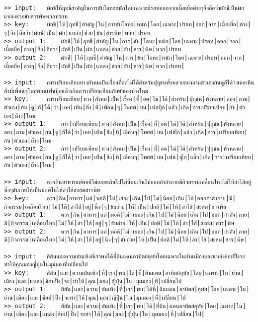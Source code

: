 \documentclass[11pt]{article}
\begin{document}
\begin{Verbatim}[commandchars=\\\{\}]
>> input:	ผักชีให้ฤทธิ์สำคัญในการขับโลหะหนักโดยเฉพาะปรอทออกจากเนื้อเยื่อต่างๆจึงถือว่าผักชีเป็นผักแหล่งช่วยขับสารพิษพวกปรอท
>> key:		ผักชี|ให้|ฤทธิ์|สำคัญ|ใน|การขับโลหะ|หนัก|โดย|เฉพาะ|ปรอท|ออก|จาก|เนื้อเยื่อ|ต่าง|ๆ|จึง|ถือว่า|ผักชี|เป็น|ผัก|แหล่ง|ช่วย|ขับ|สารพิษ|พวก|ปรอท
>> output 1:	ผักชี|ให้|ฤทธิ์|สำคัญ|ใน|การ|ขับ|โลหะ|หนัก|โดย|เฉพาะ|ปรอท|ออก|จาก|เนื้อเยื่อ|ต่างๆ|จึง|ถือว่า|ผักชี|เป็น|ผัก|แหล่ง|ช่วย|ขับ|สาร|พิษ|พวก|ปรอท
>> output 2:	ผักชี||ให้|ฤทธิ์|สำคัญ|ใน|การ|ขับ|โลหะ|หนัก|โดย|เฉพาะ|ปรอท|ออก|จาก|เนื้อเยื่อ|ต่างๆ|จึง|ถือว่า|ผักชี|เป็น|ผัก|แหล่ง|ช่วย|ขับ|สาร|พิษ|พวก|ปรอท|

>> input:	การเปรียบเทียบทางสังคมเป็นเรื่องที่อดไม่ได้สำหรับปุถุชนทั้งหลายลองถามตัวเองกันดูก็ได้ว่าเคยเห็นสิ่งที่เพื่อนๆโพสต์บนเฟซบุ๊กแล้วเกิดการเปรียบเทียบกับตัวเองบ้างไหม
>> key:		การเปรียบเทียบ|ทาง|สังคม|เป็น|เรื่อง|ที่|อด|ไม่|ได้|สำหรับ|ปุถุชน|ทั้งหลาย|ลอง|ถาม|ตัวเอง|กัน|ดู|ก็|ได้|ว่า|เคย|เห็น|สิ่ง|ที่|เพื่อน|ๆ|โพสต์|บน|เฟซบุ๊ก|แล้ว|เกิด|การเปรียบเทียบ|กับ|ตัวเอง|บ้าง|ไหม
>> output 1:	การ|เปรียบเทียบ|ทาง|สังคม|เป็น|เรื่อง|ที่|อด|ไม่|ได้|สำหรับ|ปุถุชน|ทั้งหลาย|ลอง|ถาม|ตัวเอง|กัน|ดู|ก็ได้|ว่า|เคย|เห็น|สิ่ง|ที่|เพื่อนๆ|โพสต์|บน|เฟซ|๊ก|แล้ว|เกิด|การ|เปรียบเทียบ|กับ|ตัวเอง|บ้าง|ไหม
>> output 2:	การ|เปรียบเทียบ|ทาง|สังคม|เป็น|เรื่อง|ที่|อด|ไม่|ได้|สำหรับ|ปุถุชน|ทั้งหลาย|ลอง|ถาม|ตัวเอง|กัน|ดู|ก็ได้|ว่า|เคย|เห็น|สิ่ง|ที่|เพื่อนๆ|โพสต์|บน|เฟซ|บุ|๊ก|แล้ว|เกิด|การ|เปรียบเทียบ|กับ|ตัวเอง|บ้าง|ไหม|

>> input:	ควรกินอาหารแต่พอดีไม่เยอะเกินไปไม่น้อยเกินไปออกกำลังกายมีกิจกรรมเคลื่อนไหวไม่ให้ลำไส้อยู่นิ่งๆขับถ่ายให้เป็นปกติไม่ให้ลำไส้สะสมสารพิษ
>> key:		ควร|กิน|อาหาร|แต่|พอดี|ไม่|เยอะ|เกิน|ไป|ไม่|น้อย|เกิน|ไป|ออกกำลังกาย|มี|กิจกรรม|เคลื่อนไหว|ไม่|ให้|ลำไส้|อยู่|นิ่ง|ๆ|ขับถ่าย|ให้|เป็น|ปกติ|ไม่|ให้|ลำไส้|สะสม|สารพิษ
>> output 1:	ควร|กิน|อาหาร|แต่|พอดี|ไม่|เยอะ|เกิน|ไป|ไม่|น้อย|เกิน|ไป|ออก|กำลัง|กาย|มี|กิจกรรม|เคลื่อนไหว|ไม่|ให้|ลำ|ไส้|อยู่|ๆ|ขับถ่าย|ให้|เป็น|ปกติ|ไม่|ให้|ลำ|ไส้|สะสม|สาร|พิษ
>> output 2:	ควร|กิน|อาหาร|แต่|พอดี|ไม่|เยอะ|เกิน|ไป|ไม่|น้อย|เกิน|ไป|ออก|กำลัง|กาย|มี|กิจกรรม|เคลื่อนไหว|ไม่|ให้|ลำ|ไส้|อยู่|นิ่ง|ๆ|ขับถ่าย|ให้|เป็น|ปกติ|ไม่|ให้|ลำ|ไส้|สะสม|สาร|พิษ|

>> input:	สีสันและความบันเทิงที่เราพบได้ที่ดินแดนอาทิตย์อุทัยโดยเฉพาะในย่านเมืองและแหล่งช้อปปิ้งจะทำให้คุณมองญี่ปุ่นในมุมมองที่เปลี่ยนไป
>> key:		สีสัน|และ|ความบันเทิง|ที่|เรา|พบ|ได้|ที่|ดินแดน|อาทิตย์อุทัย|โดย|เฉพาะ|ใน|ย่าน|เมือง|และ|แหล่ง|ช้อปปิ้ง|จะ|ทำให้|คุณ|มอง|ญี่ปุ่น|ใน|มุมมอง|ที่|เปลี่ยนไป
>> output 1:	สีสัน|และ|ความ|บันเทิง|ที่|เรา|พบ|ได้ที่|ดินแดน|อาทิตย์|อุทัย|โดย|เฉพาะ|ใน|ย่าน|เมือง|และ|ช้อป|ปิ้ง|จะทำ|ให้|คุณ|มอง|ญี่ปุ่น|ใน|มุมมอง|ที่|เปลี่ยน|ไป
>> output 2:	สีสัน|และ|ความ|บันเทิง|ที่|เรา|พบ|ได้|ที่ดิน|แดนอาทิตย์อุทัย|โดย|เฉพาะ|ใน|ย่าน|เมือง|และ|แหล่ง|ช้อป|ปิ้ง|จะทำ|ให้|คุณ|มอง|ญี่ปุ่น|ใน|มุมมอง|ที่|เปลี่ยน|ไป|


\end{Verbatim}
\end{document}
